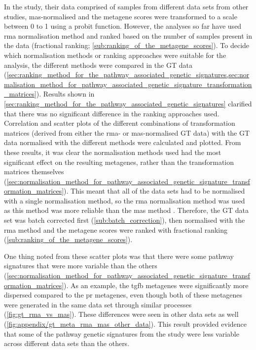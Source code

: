 In the \citet{Gatza2010a} study, their data comprised of samples from different data sets from other studies, \gls{mas}-normalised and the metagene scores were transformed to a scale between 0 to 1 using a probit function.
However, the analyses so far have used \gls{rma} normalisation method and ranked based on the number of samples present in the data (fractional ranking; \cref{sub:ranking_of_the_metagene_scores}).
To decide which normalisation methods or ranking approaches were suitable for the analysis, the different methods were compared in the GT data (\cref{sec:ranking_method_for_the_pathway_associated_genetic_signatures,sec:normalisation_method_for_pathway_associated_genetic_signature_transformation_matrices}).
Results shown in \cref{sec:ranking_method_for_the_pathway_associated_genetic_signatures} clarified that there was no significant difference in the ranking approaches used.
Correlation and scatter plots of the different combinations of transformation matrices (derived from either the \gls{rma}- or \gls{mas}-normalised GT data) with the  GT data normalised with the different methods were calculated and plotted.
From these results, it was clear the normalisation methods used had the most significant effect on the resulting metagenes, rather than the transformation matrices themselves (\cref{sec:normalisation_method_for_pathway_associated_genetic_signature_transformation_matrices}).
This meant that all of the data sets had to be normalised with a single normalisation method, so the \gls{rma} normalisation method was used as this method was more reliable than the \gls{mas} method \citep{Irizarry2003}.
Therefore, the GT data set was batch corrected first (\cref{sub:batch_correction}), then normalised with the \gls{rma} method and the metagene scores were ranked with fractional ranking (\cref{sub:ranking_of_the_metagene_scores}).

One thing noted from these scatter plots was that there were some pathway signatures that were more variable than the others (\cref{sec:normalisation_method_for_pathway_associated_genetic_signature_transformation_matrices}).
As an example, the \gls{tgfb} metagenes were significantly more dispersed compared to the \gls{pr} metagenes, even though both of these metagenes were generated in the same data set through similar processes (\cref{fig:gt_rma_vs_mas}).
These differences were seen in other data sets as well (\cref{fig:appendix/gt_meta_rma_mas_other_data}).
This result provided evidence that some of the pathway genetic signatures from the \citet{Gatza2010a} study were less variable across different data sets than the others.

